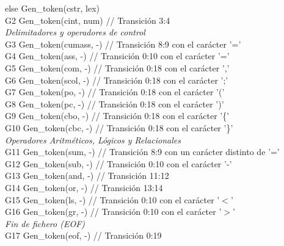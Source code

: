 \begin{tabbing}
    \> \hspace{1cm}else Gen\_token(cstr, lex) \\
    \> G2 \> Gen\_token(cint, num) \> // Transición 3:4 \\
    \textit{Delimitadores y operadores de control} \\
    \> G3 \> Gen\_token(cumass, -) \> // Transición 8:9 con el carácter '='\\
    \> G4 \> Gen\_token(ass, -) \> // Transición 0:10 con el carácter '='\\
    \> G5 \> Gen\_token(com, -) \> // Transición 0:18 con el carácter ','\\
    \> G6 \> Gen\_token(scol, -) \> // Transición 0:18 con el carácter ';'\\
    \> G7 \> Gen\_token(po, -) \> // Transición 0:18 con el carácter '('\\
    \> G8 \> Gen\_token(pc, -) \> // Transición 0:18 con el carácter ')'\\
    \> G9 \> Gen\_token(cbo, -) \> // Transición 0:18 con el carácter '\{'\\
    \> G10 \> Gen\_token(cbc, -) \> // Transición 0:18 con el carácter '\}' \\
    \textit{Operadores Aritméticos, Lógicos y Relacionales} \\
    \> G11 \> Gen\_token(sum, -) \> // Transición 8:9 con un carácter distinto de '='\\
    \> G12 \> Gen\_token(sub, -) \> // Transición 0:10 con el carácter '-'\\
    \> G13 \> Gen\_token(and, -) \> // Transición 11:12 \\
    \> G14 \> Gen\_token(or, -) \> // Transición 13:14 \\
    \> G15 \> Gen\_token(ls, -) \> // Transición 0:10 con el carácter '$<$'\\
    \> G16 \> Gen\_token(gr, -) \> // Transición 0:10 con el carácter '$>$'\\
    \textit{Fin de fichero (EOF)} \\
    \> G17 \> Gen\_token(eof, -) \> // Transición 0:19 \\
\end{tabbing}
\newpage
